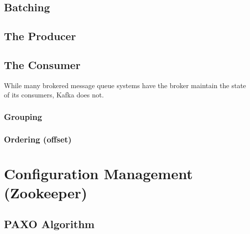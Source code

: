 \subsection{Batching}

\subsection{The Producer}

\subsection{The Consumer}
While many brokered message queue systems have the broker maintain the state of
its consumers, Kafka does not.

\subsubsection{Grouping}

\subsubsection{Ordering (offset)}

\section{Configuration Management (Zookeeper)}
\subsection{PAXO Algorithm}
